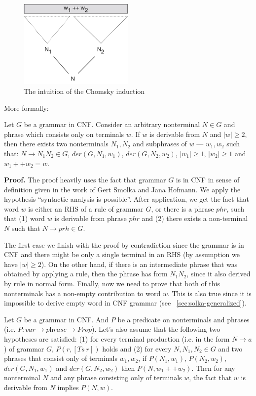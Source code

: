 \begin{figure}[htbp]
	\centering
	\includegraphics[width=0.5\textwidth]{ChomskyInductionIntuition}
	\caption{The intuition of the Chomsky induction}
	\label{fig:induction}
\end{figure}

More formally: 
\begin{lemma} \label{lemma:chomskyind1}
Let $G$ be a grammar in CNF. Consider an arbitrary nonterminal $N \in G$ and phrase which consists only on terminals $w$. 
If $w$ is derivable from $N$ and $|w| \ge 2$, then there exists two nonterminals $N_1, N_2$ and subphrases of $w$ --- $w_1, w_2$ such that: $N \to N_1 N_2 \in G$, $der(G, N_1, w_1)$, $der(G, N_2, w_2)$, $|w_1| \ge 1$, $|w_2| \ge 1$ and $w_1 ++ w_2 = w$.
\end{lemma}


\textbf{Proof.}
The proof heavily uses the fact that grammar $G$ is in CNF in sense of definition given in the work of Gert Smolka and Jana Hofmann.
We apply the hypothesis ``syntactic analysis is possible''. After application, we get the fact that word $w$ is either an RHS of a rule of grammar $G$, or there is a phrase $phr$, such that (1) word $w$ is derivable from phrase $phr$ and (2) there exists a non-terminal $N$ such that $N \to prh \in G$.

The first case we finish with the proof by contradiction since the grammar is in CNF and there might be only a single terminal in an RHS (by assumption we have $|w| \ge 2$).
On the other hand, if there is an intermediate phrase that was obtained by applying a rule, then the phrase has form $N_1 N_2$, since it also derived by rule in normal form.
Finally, now we need to prove that both of this nonterminals has a non-empty contribution to word $w$. This is also true since it is impossible to derive empty word in CNF grammar (see ~\ref{sec:solka-generalized}).

\begin{lemma}
	Let $G$ be a grammar in CNF. And $P$ be a predicate on nonterminals and phrases (i.e. $P: var \to \textit{phrase} \to \textit{Prop}$).
	Let's also assume that the following two hypotheses are satisfied:
	(1) for every terminal production (i.e. in the form $N \to a$) of grammar $G$, $P(r, [Ts \ r])$ holds and (2) for every $N, N_1, N_2 \in G$ and two phrases that consist only of terminals $w_1, w_2$, if $P(N_1, w_1)$, $P(N_2, w_2)$, $der(G, N_1, w_1)$ and $der(G, N_2, w_2)$ then $P(N, w_1 ++ w_2)$.
	Then for any nonterminal $N$ and any phrase consisting only of terminals $w$, the fact that $w$ is derivable from $N$ implies $P(N,w)$.
\end{lemma}

